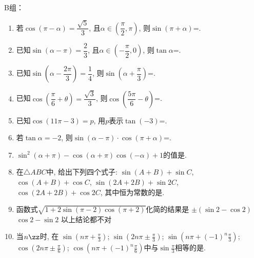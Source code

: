 B组：
\begin{enumerate}
\item 若$\cos\left(\pi-\alpha\right)=\dfrac{\sqrt5}{3}$, 且$\alpha\in\left(\dfrac{\pi}{2},\pi\right)$, 则$\sin\left(\pi+\alpha\right)$=. 

\item 已知$\sin\left(\alpha-\pi\right)=\dfrac{2}{3}$, 且$\alpha\in\left(-\dfrac{\pi}{2},0\right)$, 则$\tan\alpha$=. 

\item 已知$\sin\left(\alpha-\dfrac{2\pi}{3}\right)=\dfrac{1}{4}$, 则$\sin\left(\alpha+\dfrac{\pi}{3}\right)$=. 


\item 已知$\cos\left(\dfrac{\pi}{6}+\theta\right)=\dfrac{\sqrt{3}}{3}$, 则$\cos\left(\dfrac{5\pi}{6}-\theta\right)$=. 

\item 已知$\cos\left(11\pi-3\right)=p$, 用$p$表示$\tan\left(-3\right)$=.  


\item 若$\tan\alpha=-2$, 则$\sin\left(\alpha-\pi\right)\cdot\cos\left(\pi+\alpha\right)$=. 

\item $\sin^2\left(\alpha+\pi\right)-\cos\left(\alpha+\pi\right)\cos\left(-\alpha\right)+1$的值是.

\item 在$\triangle{ABC}$中, 给出下列四个式子: 
 $\sin\left(A+B\right)+\sin{C}$, 
 $\cos\left(A+B\right)+\cos{C}$, 
 $\sin\left(2A+2B\right)+\sin2C$, 
 $\cos\left(2A+2B\right)+\cos2C$, 其中恒为常数的是.


\item 函数式$\sqrt{1+2\sin\left(\pi-2\right)\cos\left(\pi+2\right)}$化简的结果是
{$\pm\left(\sin2-\cos2\right)$}
{$\cos2-\sin2$}
{以上结论都不对}

\item 当$n\zz$时, 在
 $\sin\left(n\pi+\frac{\pi}{3}\right)$; 
 $\sin\left(2n\pi\pm\frac{\pi}{3}\right)$; 
 $\sin\left(n\pi+\left(-1\right)^n\frac{\pi}{3}\right)$; 
 $\cos\left(2n\pi\pm\frac{\pi}{6}\right)$; 
 $\cos\left(n\pi+\left(-1\right)^n\frac{\pi}{6}\right)$中与$\sin\frac{\pi}{3}$相等的是.



\end{enumerate}
